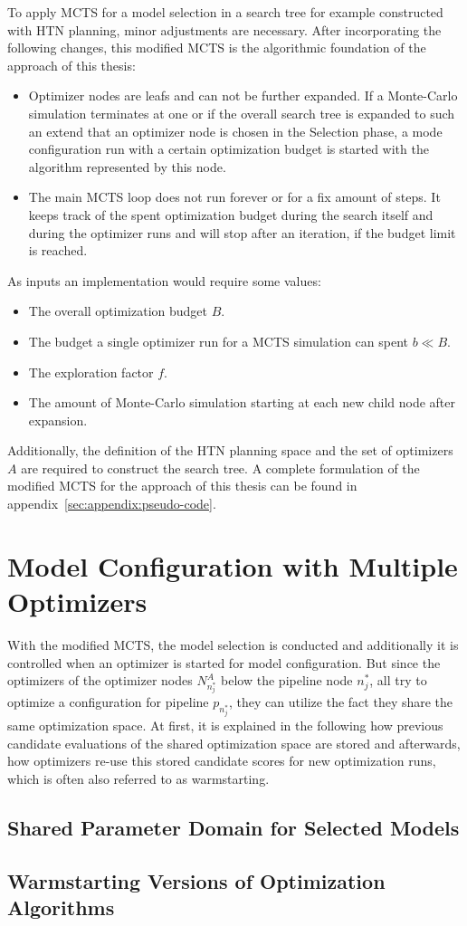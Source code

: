 To apply MCTS for a model selection in a search tree for example constructed with HTN planning, minor adjustments are necessary.
After incorporating the following changes, this modified MCTS is the algorithmic foundation of the approach of this thesis:
\begin{itemize}
    \item Optimizer nodes are leafs and can not be further expanded. If a Monte-Carlo simulation terminates at one or if the overall search tree is expanded to such an extend that an optimizer node is chosen in the Selection phase, a mode configuration run with a certain optimization budget is started with the algorithm represented by this node.
    \item The main MCTS loop does not run forever or for a fix amount of steps. It keeps track of the spent optimization budget during the search itself and during the optimizer runs and will stop after an iteration, if the budget limit is reached.
\end{itemize}
As inputs an implementation would require  some values:
\begin{itemize}
    \item The overall optimization budget $B$.
    \item The budget a single optimizer run for a MCTS simulation can spent $b \ll B$.
    \item The exploration factor $f$.
    \item The amount of Monte-Carlo simulation starting at each new child node after expansion.
\end{itemize}
Additionally, the definition of the HTN planning space and the set of optimizers $A$ are required to construct the search tree.
A complete formulation of the modified MCTS for the approach of this thesis can be found in appendix~\ref{sec:appendix:pseudo-code}.

\section{Model Configuration with Multiple Optimizers}
\label{sec:approach:configuration}
With the modified MCTS, the model selection is conducted and additionally it is controlled when an optimizer is started for model configuration.
But since the optimizers of the optimizer nodes $N^A_{n^*_j}$ below the pipeline node $n^*_j$, all try to optimize a configuration for pipeline $p_{n^*_j}$, they can utilize the fact they share the same optimization space.
At first, it is explained in the following how previous candidate evaluations of the shared optimization space are stored and afterwards, how optimizers re-use this stored candidate scores for new optimization runs, which is often also referred to as warmstarting.

\subsection{Shared Parameter Domain for Selected Models}
\label{sec:appraoch:configuration:parameter}

\Blindtext

\subsection{Warmstarting Versions of Optimization Algorithms}
\label{sec:appraoch:configuration:warmstart}

\Blindtext